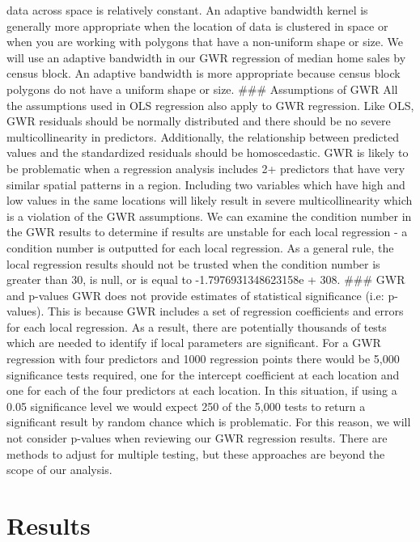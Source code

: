 \documentclass[
]{article}
\begin{document}
data across space is relatively constant. An adaptive bandwidth kernel
is generally more appropriate when the location of data is clustered in
space or when you are working with polygons that have a non-uniform
shape or size. We will use an adaptive bandwidth in our GWR regression
of median home sales by census block. An adaptive bandwidth is more
appropriate because census block polygons do not have a uniform shape or
size. \#\#\# Assumptions of GWR All the assumptions used in OLS
regression also apply to GWR regression. Like OLS, GWR residuals should
be normally distributed and there should be no severe multicollinearity
in predictors. Additionally, the relationship between predicted values
and the standardized residuals should be homoscedastic. GWR is likely to
be problematic when a regression analysis includes 2+ predictors that
have very similar spatial patterns in a region. Including two variables
which have high and low values in the same locations will likely result
in severe multicollinearity which is a violation of the GWR assumptions.
We can examine the condition number in the GWR results to determine if
results are unstable for each local regression - a condition number is
outputted for each local regression. As a general rule, the local
regression results should not be trusted when the condition number is
greater than 30, is null, or is equal to -1.7976931348623158e + 308.
\#\#\# GWR and p-values GWR does not provide estimates of statistical
significance (i.e: p-values). This is because GWR includes a set of
regression coefficients and errors for each local regression. As a
result, there are potentially thousands of tests which are needed to
identify if local parameters are significant. For a GWR regression with
four predictors and 1000 regression points there would be 5,000
significance tests required, one for the intercept coefficient at each
location and one for each of the four predictors at each location. In
this situation, if using a 0.05 significance level we would expect 250
of the 5,000 tests to return a significant result by random chance which
is problematic. For this reason, we will not consider p-values when
reviewing our GWR regression results. There are methods to adjust for
multiple testing, but these approaches are beyond the scope of our
analysis.

\hypertarget{results}{%
\section{Results}\label{results}}
\end{document}
